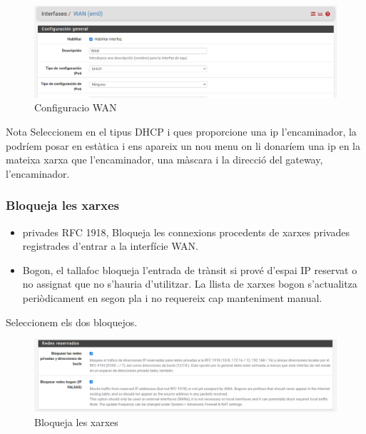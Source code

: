 \documentclass[
  10pt,
]{krantz}
\providecommand{\tightlist}{%
  \setlength{\itemsep}{0pt}\setlength{\parskip}{0pt}}
\begin{document}
\begin{figure}
\centering
\includegraphics{imatges/pfsense_WAN.png}
\caption{Configuracio WAN}
\end{figure}

\begin{rmdtip}{Nota}
Seleccionem en el tipus DHCP i ques proporcione una ip l'encaminador, la podríem posar en estàtica i ens apareix un nou menu on li donaríem una ip en la mateixa xarxa que l'encaminador, una màscara i la direcció del gateway, l'encaminador.

\end{rmdtip}

\hypertarget{bloqueja-les-xarxes}{%
\subsubsection{Bloqueja les xarxes}\label{bloqueja-les-xarxes}}

\begin{itemize}
\tightlist
\item
  privades RFC 1918, Bloqueja les connexions procedents de xarxes privades registrades d'entrar a la interfície WAN.
\item
  Bogon, el tallafoc bloqueja l'entrada de trànsit si prové d'espai IP reservat o no assignat que no s'hauria d'utilitzar. La llista de xarxes bogon s'actualitza periòdicament en segon pla i no requereix cap manteniment manual.
\end{itemize}

Seleccionem els dos bloquejos.

\begin{figure}
\centering
\includegraphics{imatges/pfsense_reservado.png}
\caption{Bloqueja les xarxes}
\end{figure}
\end{document}
